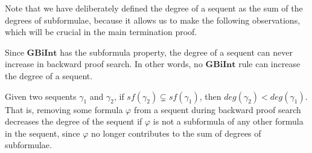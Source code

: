 \documentclass{llncs}
\numberwithin{equation}{section}
\newcommand{\GBiInt}{\mathbf{GBiInt}}
\begin{document}
Note that we have deliberately defined the degree of a sequent as the sum of the degrees of subformulae, because it allows us to make the following observations, which will be crucial in the main termination proof.

\begin{corollary}\label{cannotIncrease}
Since $\GBiInt$ has the subformula property, the degree of a sequent can never increase in backward proof search. In other words, no $\GBiInt$ rule can increase the degree of a sequent.
\end{corollary}

\begin{corollary}\label{mustDecrease}
Given two sequents $\gamma_1$ and $\gamma_2$, if $sf(\gamma_2) \subsetneq sf(\gamma_1)$, then $deg(\gamma_2) < deg(\gamma_1)$. That is, removing some formula $\varphi$ from a sequent during backward proof search decreases the degree of the sequent if $\varphi$ is not a subformula of any other formula in the sequent, since $\varphi$ no longer contributes to the sum of degrees of subformulae.
\end{corollary}
\end{document}
